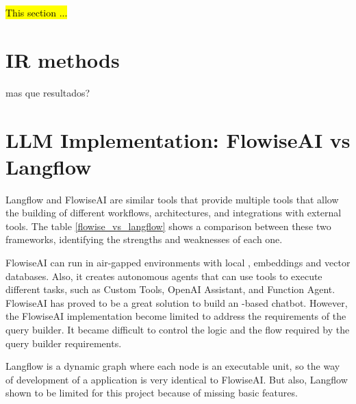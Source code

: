 \hl{This section ...}



\section{IR methods}

mas que resultados?


\section{LLM Implementation: FlowiseAI vs Langflow}

% 

Langflow and FlowiseAI are similar tools that provide multiple tools that allow the building of different workflows, architectures, and integrations with external tools. The table \ref{flowise_vs_langflow} shows a comparison between these two frameworks, identifying the strengths and weaknesses of each one.

FlowiseAI can run in air-gapped environments with local {\llm}, embeddings and vector databases. Also, it creates autonomous agents that can use tools to execute different tasks, such as Custom Tools, OpenAI Assistant, and Function Agent. FlowiseAI has proved to be a great solution to build an {\llm}-based chatbot. However, the FlowiseAI implementation become limited to address the requirements of the query builder. It became difficult to control the logic and the flow required by the query builder requirements. 

Langflow is a dynamic graph where each node is an executable unit, so the way of development of a {\llm} application is very identical to FlowiseAI. But also, Langflow shown to be limited for this project because of missing basic features.

\begin{table}[H]
	\centering
	\caption{Comparison between FlowiseAI and Langflow.}
	\label{flowise_vs_langflow}
\end{table}

